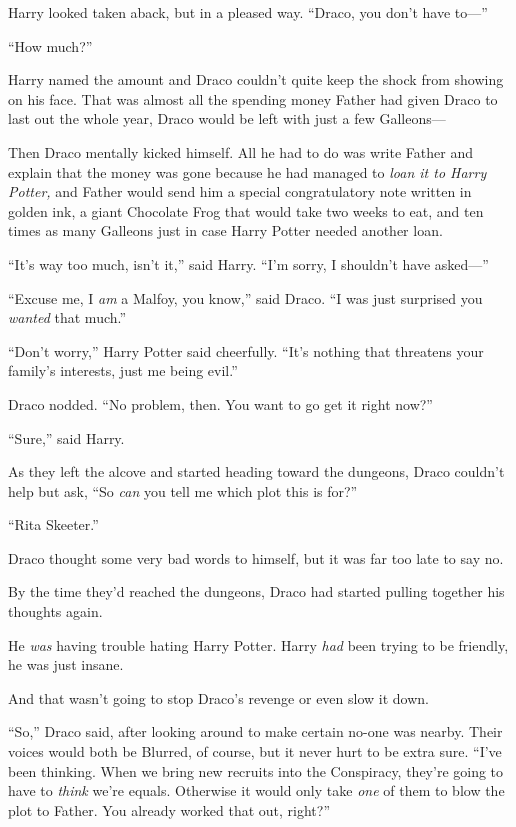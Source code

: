 Harry looked taken aback, but in a pleased way. “Draco, you don’t have to—”

“How much?”

Harry named the amount and Draco couldn’t quite keep the shock from showing on his face. That was almost all the spending money Father had given Draco to last out the whole year, Draco would be left with just a few Galleons—

Then Draco mentally kicked himself. All he had to do was write Father and explain that the money was gone because he had managed to \emph{loan it to Harry Potter,} and Father would send him a special congratulatory note written in golden ink, a giant Chocolate Frog that would take two weeks to eat, and ten times as many Galleons just in case Harry Potter needed another loan.

“It’s way too much, isn’t it,” said Harry. “I’m sorry, I shouldn’t have asked—”

“Excuse me, I \emph{am} a Malfoy, you know,” said Draco. “I was just surprised you \emph{wanted} that much.”

“Don’t worry,” Harry Potter said cheerfully. “It’s nothing that threatens your family’s interests, just me being evil.”

Draco nodded. “No problem, then. You want to go get it right now?”

“Sure,” said Harry.

As they left the alcove and started heading toward the dungeons, Draco couldn’t help but ask, “So \emph{can} you tell me which plot this is for?”

“Rita Skeeter.”

Draco thought some very bad words to himself, but it was far too late to say no.

\later

By the time they’d reached the dungeons, Draco had started pulling together his thoughts again.

He \emph{was} having trouble hating Harry Potter. Harry \emph{had} been trying to be friendly, he was just insane.

And that wasn’t going to stop Draco’s revenge or even slow it down.

“So,” Draco said, after looking around to make certain no-one was nearby. Their voices would both be Blurred, of course, but it never hurt to be extra sure. “I’ve been thinking. When we bring new recruits into the Conspiracy, they’re going to have to \emph{think} we’re equals. Otherwise it would only take \emph{one} of them to blow the plot to Father. You already worked that out, right?”

